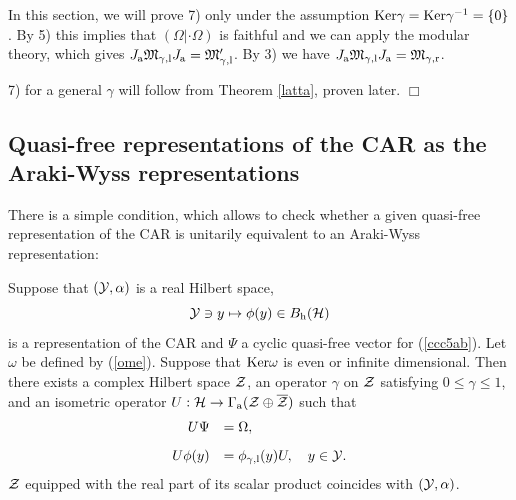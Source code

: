 \documentclass{svmult}
\newcommand{\beq}{\begin{equation}}
\newcommand{\eeq}{\end{equation}}
\def\bet{\begin{theorem}}
\def\eet{\end{theorem}}
\def\bar{\overline}
\def\l{{\rm l}}
\def\r{{\rm r}}
\def\h{{\rm h}}
\def\cZ{{\cal Z}}
\def\cY{{\cal Y}}
\def\fM{{\mathfrak M}}
\def\a{{\rm a}}
\def\Ker{{\rm Ker}}
\def\qed{$\Box$\medskip}
\def\cH{{\cal H}}
\def\l{{\rm l}}
\def\r{{\rm r}}
\def\Ker{{\rm Ker}}
\def\cH{{\cal H}}
\begin{document}
In this section, 
we  will  prove  7) only under the assumption
 $\Ker\gamma=\Ker\gamma^{-1}=\{0\}$. By 5) this implies that
 $(\Omega|\cdot\Omega)$ is faithful and we can apply the modular theory, which
 gives 
$J_\a\fM_{\gamma,\l}J_\a=\fM'_{\gamma,\l}$. By 3) we have
$J_\a\fM_{\gamma,\l}J_\a=\fM_{\gamma,\r}$.

7) for a general $\gamma$ will follow from Theorem \ref{latta}, proven later.
 \qed

\subsection{Quasi-free representations of the CAR as the Araki-Wyss
  representations}

There is a simple condition, which allows to check whether a
given  quasi-free representation of the CAR is unitarily equivalent to
an Araki-Wyss representation:

\bet
Suppose that $(\cY,\alpha)$ is a real Hilbert space,
\beq \cY\ni y\mapsto \phi(y)\in B_\h(\cH)\label{ccc5ab}\eeq
is a  representation of the CAR 
and $\Psi$ a cyclic quasi-free vector for 
(\ref{ccc5ab}). Let $\omega$ be defined by (\ref{ome}).
Suppose that $\Ker\omega$ is even or infinite dimensional.
Then 
there exists a complex Hilbert space $\cZ$,
 an operator $\gamma$ on $\cZ$ satisfying
$0\leq\gamma\leq 1$,
and an isometric operator $U:\cH\to\Gamma_\a(\cZ\oplus\bar\cZ)$ such that
\[\begin{array}{rl}
U\Psi&=\Omega,\\[3mm]
U \phi(y)&=\phi_{\gamma,\l}(y)U,\ \ \ y\in\cY.\end{array}\]
$\cZ$ equipped with the real part of its scalar product
coincides with  
 $(\cY,\alpha)$. 
\eet
\end{document}
